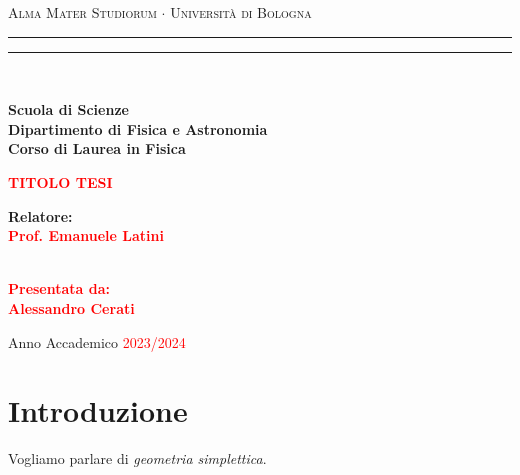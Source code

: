 \documentclass[%
  twoside,           %
  corpo=12pt,        %
  tipotesi=custom, %
  draft
]{toptesi}
\begin{document}
\begin{titlepage}
  \begin{center}
  {{\Large{\textsc{Alma Mater Studiorum $\cdot$ Università di Bologna}}}} 
  \rule[0.1cm]{\textwidth}{0.1mm}
  \rule[0.5cm]{\textwidth}{0.6mm}
  \\\vspace{3mm}
  
  {\small{\bf Scuola di Scienze \\ 
  Dipartimento di Fisica e Astronomia\\
  Corso di Laurea in Fisica}}
  
  \end{center}
  
  \vspace{23mm}
  
  \begin{center}\textcolor{red}{
  {\LARGE{\bf TITOLO TESI}}\\
  }\end{center}
  
  \vspace{50mm} \par \noindent
  
  \begin{minipage}[t]{0.47\textwidth}
  {\large{\bf Relatore: \vspace{2mm}\\\textcolor{red}{
  Prof. Emanuele Latini}}}\\\\

  \end{minipage}
  \hfill
  \begin{minipage}[t]{0.47\textwidth}\raggedleft \textcolor{red}{
  {\large{\bf Presentata da:
  \vspace{2mm}\\
  Alessandro Cerati}}}
  \end{minipage}
  
  \vspace{40mm}
  
  \begin{center}
  Anno Accademico \textcolor{red}{ 2023/2024}
  \end{center}
  
  \end{titlepage}

\chapter{Introduzione}
Vogliamo parlare di \emph{geometria simplettica}.
\end{document}
